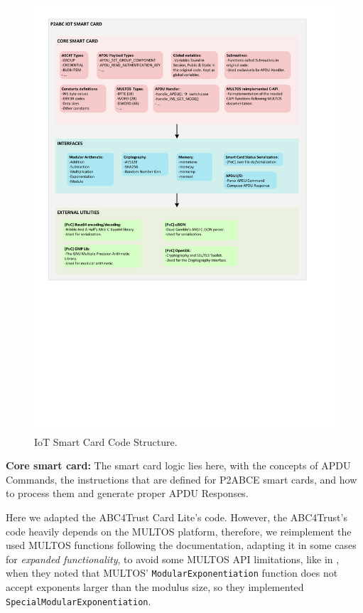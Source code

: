 \begin{figure}[bth]
	\begin{center}
		\includegraphics[width=\linewidth]{gfx/IoTCScomponents-color}
	\end{center}
	\caption{IoT Smart Card Code Structure.}
	\label{fig:IoTCScomponents-bw}
\end{figure}


\hfil

\textbf{Core smart card:} The smart card logic lies here, with the concepts of APDU Commands, the instructions that are defined for P2ABCE smart cards, and how to process them and generate proper APDU Responses.

Here we adapted the ABC4Trust Card Lite's code. However, the ABC4Trust's code heavily depends on the MULTOS platform, therefore, we reimplement the used MULTOS functions following the documentation, adapting it in some cases for \textit{expanded functionality}, to avoid some MULTOS API limitations, like in \cite{vullers2013efficient}, when they noted that MULTOS' \texttt{ModularExponentiation}  function does not accept exponents larger than the modulus size, so they implemented \texttt{SpecialModularExponentiation}.

